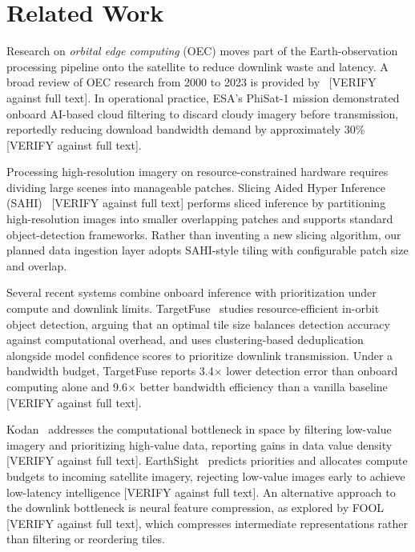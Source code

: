 \documentclass[conference]{IEEEtran}
\begin{document}
\section{Related Work}

Research on \emph{orbital edge computing} (OEC) moves part of the Earth-observation processing pipeline onto the satellite to reduce downlink waste and latency. A broad review of OEC research from 2000 to 2023 is provided by~\cite{oecsurvey} [VERIFY against full text]. In operational practice, ESA's PhiSat-1 mission demonstrated onboard AI-based cloud filtering to discard cloudy imagery before transmission, reportedly reducing download bandwidth demand by approximately 30\%~\cite{phisat1} [VERIFY against full text].

Processing high-resolution imagery on resource-constrained hardware requires dividing large scenes into manageable patches. Slicing Aided Hyper Inference (SAHI)~\cite{sahi} [VERIFY against full text] performs sliced inference by partitioning high-resolution images into smaller overlapping patches and supports standard object-detection frameworks. Rather than inventing a new slicing algorithm, our planned data ingestion layer adopts SAHI-style tiling with configurable patch size and overlap.

Several recent systems combine onboard inference with prioritization under compute and downlink limits. TargetFuse~\cite{targetfuse} studies resource-efficient in-orbit object detection, arguing that an optimal tile size balances detection accuracy against computational overhead, and uses clustering-based deduplication alongside model confidence scores to prioritize downlink transmission. Under a bandwidth budget, TargetFuse reports 3.4$\times$ lower detection error than onboard computing alone and 9.6$\times$ better bandwidth efficiency than a vanilla baseline~\cite{targetfuse} [VERIFY against full text].

Kodan~\cite{kodan} addresses the computational bottleneck in space by filtering low-value imagery and prioritizing high-value data, reporting gains in data value density [VERIFY against full text]. EarthSight~\cite{earthsight} predicts priorities and allocates compute budgets to incoming satellite imagery, rejecting low-value images early to achieve low-latency intelligence [VERIFY against full text]. An alternative approach to the downlink bottleneck is neural feature compression, as explored by FOOL~\cite{fool} [VERIFY against full text], which compresses intermediate representations rather than filtering or reordering tiles.
\end{document}

